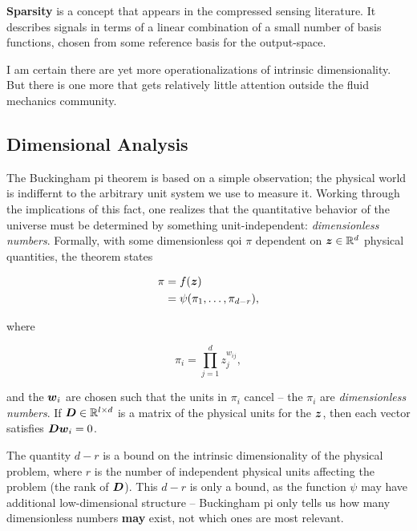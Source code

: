 \documentclass{article}
\begin{document}
\bigskip\noindent \textbf{Sparsity} is a concept that appears in the compressed
sensing literature.\cite{candes2008introduction} It describes signals in terms
of a linear combination of a small number of basis functions, chosen from some
reference basis for the output-space.

\bigskip
I am certain there are yet more operationalizations of intrinsic dimensionality.
But there is one more that gets relatively little attention outside the fluid
mechanics community.

\subsection{Dimensional Analysis}
The Buckingham pi theorem\cite{buckingham1914} is based on a simple observation;
the physical world is indiffernt to the arbitrary unit system we use to measure
it. Working through the implications of this fact, one realizes that the
quantitative behavior of the universe must be determined by something
unit-independent: \emph{dimensionless numbers}. Formally, with some
dimensionless qoi $\pi$ dependent on $\boldsymbol{z}\in\mathbb{R}^{d}$ physical quantities, the
theorem states

\begin{equation} \begin{aligned}
    \pi &= f(\boldsymbol{z}) \\
        &= \psi(\pi_1,\dots,\pi_{d-r}),
\end{aligned} \end{equation}

\noindent where

\begin{equation}
  \pi_i = \prod_{j=1}^d z_j^{w_{ij}},
\end{equation}

\noindent and the $\boldsymbol{w}_i$ are chosen such that the units in $\pi_i$ cancel --
the $\pi_i$ are \emph{dimensionless numbers}. If $\boldsymbol{D}\in\mathbb{R}^{l\times d}$ is a
matrix of the physical units for the $\boldsymbol{z}$, then each vector satisfies
$\boldsymbol{D}\boldsymbol{w}_i=0$.

The quantity $d-r$ is a bound on the intrinsic dimensionality of the physical
problem, where $r$ is the number of independent physical units affecting the
problem (the rank of $\boldsymbol{D}$). This $d-r$ is only a bound, as the function $\psi$
may have additional low-dimensional structure -- Buckingham pi only tells us how
many dimensionless numbers \textbf{may} exist, not which ones are most relevant.
\end{document}
